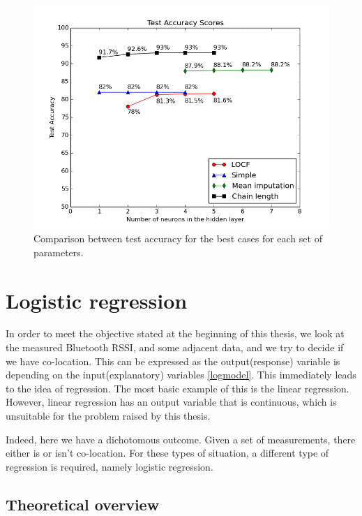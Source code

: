 \begin{figure}[h]
	\begin{center}
		\includegraphics[scale=0.6]{figures/ann_total.png}
	\end{center}
	
	\caption{Comparison between test accuracy for the best cases for each set of parameters.}
	\label{pic:ann_total}

\end{figure}
     

\section{Logistic regression}

In order to meet the objective stated at the beginning of this thesis, we look at the measured Bluetooth RSSI, and some adjacent data, and we try to decide if we have co-location. This can be expressed as the output(response) variable is depending on the input(explanatory) variables  \ref{logmodel}. This immediately leads to the idea of regression. The most basic example of this is the linear regression. However, linear regression has an output variable that is continuous, which is unsuitable for the problem raised by this thesis.

Indeed, here we have a dichotomous outcome. Given a set of measurements, there either is or isn't co-location. For these types of situation, a different type of regression is required, namely logistic regression. 

\subsection{Theoretical overview}

